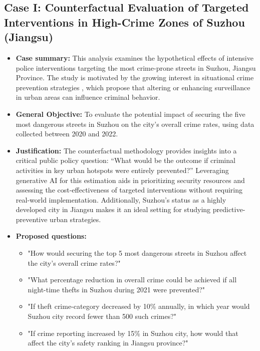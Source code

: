 \subsection{Case I: Counterfactual Evaluation of Targeted Interventions in High-Crime Zones of Suzhou (Jiangsu)}

\begin{itemize}
    \item \textbf{Case summary:} This analysis examines the hypothetical effects of intensive police interventions targeting the most crime-prone streets in Suzhou, Jiangsu Province. The study is motivated by the growing interest in situational crime prevention strategies \cite{clarke1995situational}, which propose that altering or enhancing surveillance in urban areas can influence criminal behavior. 
        \item \textbf{General Objective:} To evaluate the potential impact of securing the five most dangerous streets in Suzhou on the city’s overall crime rates, using data collected between 2020 and 2022.
        \item \textbf{Justification:} The counterfactual methodology provides insights into a critical public policy question: “What would be the outcome if criminal activities in key urban hotspots were entirely prevented?” Leveraging generative AI for this estimation aids in prioritizing security resources and assessing the cost-effectiveness of targeted interventions without requiring real-world implementation. Additionally, Suzhou’s status as a highly developed city in Jiangsu makes it an ideal setting for studying predictive-preventive urban strategies.
        \item \textbf{Proposed questions:}
        \begin{itemize}
            \item "How would securing the top 5 most dangerous streets in Suzhou affect the city’s overall crime rates?"
            \item "What percentage reduction in overall crime could be achieved if all night-time thefts in Suzhou during 2021 were prevented?"
            \item "If theft crime-category decreased by 10\% annually, in which year would Suzhou city record fewer than 500 such crimes?"
            \item "If crime reporting increased by 15\% in Suzhou city, how would that affect the city's safety ranking in Jiangsu province?"
        \end{itemize}




\end{itemize}


